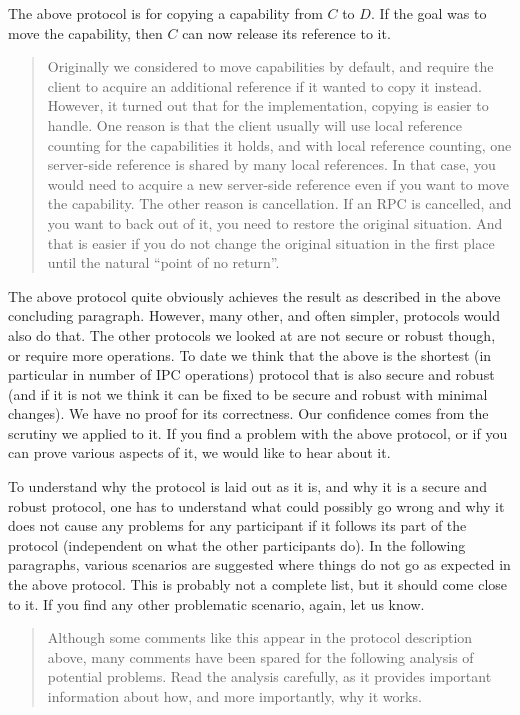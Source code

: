 \documentclass[9pt,a4paper]{extarticle}
\newenvironment{comment}{\footnotesize \begin{quote}}{\end{quote}}
\begin{document}
The above protocol is for copying a capability from $C$ to $D$.  If
the goal was to move the capability, then $C$ can now release its
reference to it.

\begin{comment}
  Originally we considered to move capabilities by default, and
  require the client to acquire an additional reference if it wanted
  to copy it instead.  However, it turned out that for the
  implementation, copying is easier to handle.  One reason is that the
  client usually will use local reference counting for the
  capabilities it holds, and with local reference counting, one
  server-side reference is shared by many local references.  In that
  case, you would need to acquire a new server-side reference even if
  you want to move the capability.  The other reason is cancellation.
  If an RPC is cancelled, and you want to back out of it, you need to
  restore the original situation.  And that is easier if you do not
  change the original situation in the first place until the natural
  ``point of no return''.
\end{comment}

The above protocol quite obviously achieves the result as described in
the above concluding paragraph.  However, many other, and often
simpler, protocols would also do that.  The other protocols we looked
at are not secure or robust though, or require more operations.  To
date we think that the above is the shortest (in particular in number
of IPC operations) protocol that is also secure and robust (and if it
is not we think it can be fixed to be secure and robust with minimal
changes).  We have no proof for its correctness.  Our confidence comes
from the scrutiny we applied to it.  If you find a problem with the
above protocol, or if you can prove various aspects of it, we would
like to hear about it.

To understand why the protocol is laid out as it is, and why it is a
secure and robust protocol, one has to understand what could possibly
go wrong and why it does not cause any problems for any participant if
it follows its part of the protocol (independent on what the other
participants do).  In the following paragraphs, various scenarios are
suggested where things do not go as expected in the above protocol.
This is probably not a complete list, but it should come close to it.
If you find any other problematic scenario, again, let us know.

\begin{comment}
  Although some comments like this appear in the protocol description
  above, many comments have been spared for the following analysis of
  potential problems.  Read the analysis carefully, as it provides
  important information about how, and more importantly, why it works.
\end{comment}
\end{document}
